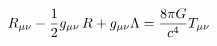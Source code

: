 \documentclass[preview]{standalone}
\begin{document}
\begin{align*}
R_{\mu \nu} - {1 \over 2}g_{\mu \nu}\,R + g_{\mu \nu} \Lambda = {8 \pi G \over c^4} T_{\mu \nu}
\end{align*}
\end{document}
